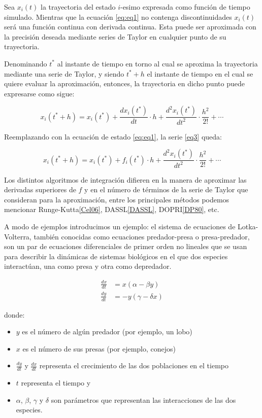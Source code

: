 	Sea $x_i (t)$ la trayectoria del estado $i$-esimo expresada como función de tiempo simulado. 
	Mientras que la ecuación  \eqref{eq:eq1} no contenga discontinuidades $x_i (t)$ será una función continua con derivada continua. 
	Esta puede ser aproximada con la precisión deseada mediante series de Taylor en cualquier punto de su trayectoria.

	Denominando $t^{\ast}$ al instante de tiempo en torno al cual se aproxima la trayectoria mediante una serie de Taylor, y siendo $t^{\ast} + h$
	 el instante de tiempo en el cual se quiere evaluar la aproximación, entonces, la trayectoria en dicho punto puede expresarse como sigue:

	\begin{equation} \label{eq3}
		x_i(t^* + h) = x_i(t^*) + \frac{dx_i (t^*)}{dt} \cdot h + \frac{d^{2}x_i (t^*)}{dt^2} \cdot \frac{h^2}{2!} + \cdots
	\end{equation}

	Reemplazando con la ecuación de estado \ref{eq:eq1}, la serie \eqref{eq3} queda:

	\begin{equation} \label{eq4}
		x_i(t^* + h) = x_i(t^*) + f_i(t^*) \cdot h + \frac{d^{2}x_i (t^*)}{dt^2} \cdot \frac{h^2}{2!} + \cdots
	\end{equation}

	Los distintos algoritmos de integración difieren en la manera de aproximar las derivadas superiores de $f$ y en el número de
	 términos de la serie de Taylor que consideran para la aproximación, entre los principales métodos podemos mencionar Runge-Kutta\ref{Cel06}, DASSL\ref{DASSL}, DOPRI\ref{DP80}, etc.

	A modo de ejemplos introducimos un ejemplo: el sistema de ecuaciones de Lotka-Volterra, también conocidas como ecuaciones predador-presa o presa-predador,
	son un par de ecuaciones diferenciales de primer orden no lineales que se usan para describir la dinámicas de sistemas biológicos en el que dos 
	especies interactúan, una como presa y otra como depredador.

	\begin{align*}
		\frac{dx}{dt} &= x(\alpha - \beta y) \\
		\frac{dy}{dt} &= - y(\gamma - \delta  x)
	\end{align*}

	donde:
	\begin{itemize}
		\item $y$ es el número de algún predador (por ejemplo, un lobo)
		\item $x$ es el número de sus presas (por ejemplo, conejos)
		\item $\frac{dy}{dt}$ y $\frac{dx}{dt}$ representa el crecimiento de las dos poblaciones en el tiempo
		\item $t$ representa el tiempo y
		\item $\alpha$, $\beta$, $\gamma$ y $\delta$ son parámetros que representan las interacciones de las dos especies.
	\end{itemize}

